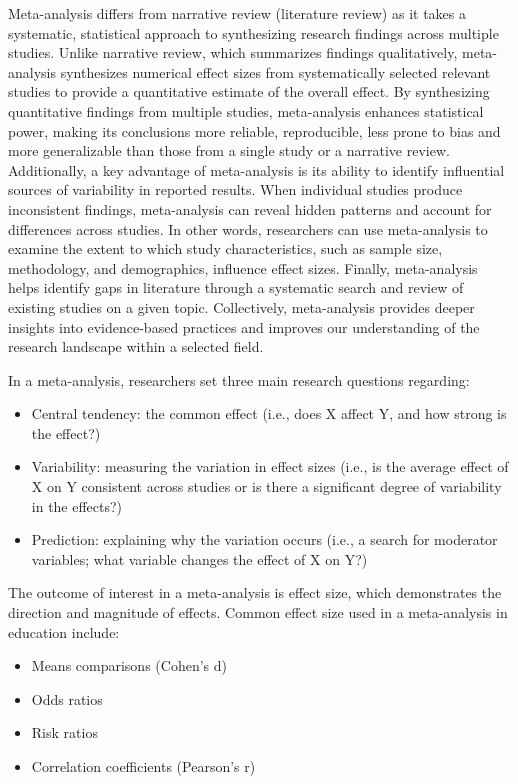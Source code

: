 \documentclass[
  letterpaper,
  DIV=11,
  numbers=noendperiod]{scrreprt}
\begin{document}
Meta-analysis differs from narrative review (literature review) as it
takes a systematic, statistical approach to synthesizing research
findings across multiple studies. Unlike narrative review, which
summarizes findings qualitatively, meta-analysis synthesizes numerical
effect sizes from systematically selected relevant studies to provide a
quantitative estimate of the overall effect. By synthesizing
quantitative findings from multiple studies, meta-analysis enhances
statistical power, making its conclusions more reliable, reproducible,
less prone to bias and more generalizable than those from a single study
or a narrative review. Additionally, a key advantage of meta-analysis is
its ability to identify influential sources of variability in reported
results. When individual studies produce inconsistent findings,
meta-analysis can reveal hidden patterns and account for differences
across studies. In other words, researchers can use meta-analysis to
examine the extent to which study characteristics, such as sample size,
methodology, and demographics, influence effect sizes. Finally,
meta-analysis helps identify gaps in literature through a systematic
search and review of existing studies on a given topic. Collectively,
meta-analysis provides deeper insights into evidence-based practices and
improves our understanding of the research landscape within a selected
field.

In a meta-analysis, researchers set three main research questions
regarding:

\begin{itemize}
\item
  Central tendency: the common effect (i.e., does X affect Y, and how
  strong is the effect?)
\item
  Variability: measuring the variation in effect sizes (i.e., is the
  average effect of X on Y consistent across studies or is there a
  significant degree of variability in the effects?)
\item
  Prediction: explaining why the variation occurs (i.e., a search for
  moderator variables; what variable changes the effect of X on Y?)
\end{itemize}

The outcome of interest in a meta-analysis is effect size, which
demonstrates the direction and magnitude of effects. Common effect size
used in a meta-analysis in education include:

\begin{itemize}
\item
  Means comparisons (Cohen's d)
\item
  Odds ratios
\item
  Risk ratios
\item
  Correlation coefficients (Pearson's r)
\end{itemize}
\end{document}
